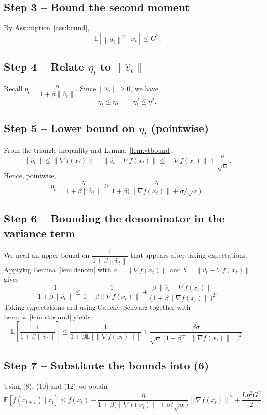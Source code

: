 \documentclass{article}
\newcommand{\EE}{\mathbb{E}}
\newcommand{\norm}[1]{\left\|#1\right\|}
\begin{document}
\subsection*{Step 3 – Bound the second moment}
By Assumption~\ref{ass:bound},
\[
\EE\!\left[\norm{g_t}^{2}\mid x_t\right]\le G^{2}.
\tag{7}
\]

\subsection*{Step 4 – Relate $\eta_t$ to $\norm{\hat v_t}$}
Recall $\eta_t=\dfrac{\eta}{1+\beta\norm{\hat v_t}}$.
Since $\norm{\hat v_t}\ge0$, we have
\[
\eta_t\le\eta,\qquad 
\eta_t^{2}\le\eta^{2}.
\tag{8}
\]

\subsection*{Step 5 – Lower bound on $\eta_t$ (pointwise)}
From the triangle inequality and Lemma~\ref{lem:vtbound},
\[
\norm{\hat v_t}\le \norm{\nabla f(x_t)}+\norm{\hat v_t-\nabla f(x_t)}
\le \norm{\nabla f(x_t)}+\frac{\sigma}{\sqrt{\alpha}} .
\tag{9}
\]
Hence, pointwise,
\[
\eta_t
=\frac{\eta}{1+\beta\norm{\hat v_t}}
\ge
\frac{\eta}{1+\beta\bigl(\norm{\nabla f(x_t)}+\sigma/\sqrt{\alpha}\bigr)} .
\tag{10}
\]

\subsection*{Step 6 – Bounding the denominator in the variance term}
We need an upper bound on $\dfrac{1}{1+\beta\norm{\hat v_t}}$ that appears after taking expectations.
Applying Lemma~\ref{lem:denom} with $a=\norm{\nabla f(x_t)}$ and
$b=\norm{\hat v_t-\nabla f(x_t)}$ gives
\[
\frac{1}{1+\beta\norm{\hat v_t}}
\le
\frac{1}{1+\beta\norm{\nabla f(x_t)}}
+\frac{\beta\,\norm{\hat v_t-\nabla f(x_t)}}{\bigl(1+\beta\norm{\nabla f(x_t)}\bigr)^{2}} .
\tag{11}
\]
Taking expectations and using Cauchy–Schwarz together with Lemma~\ref{lem:vtbound} yields
\[
\EE\!\left[\frac{1}{1+\beta\norm{\hat v_t}}\right]
\le
\frac{1}{1+\beta\EE\!\left[\norm{\nabla f(x_t)}\right]}
+\frac{\beta\sigma}{\sqrt{\alpha}\,\bigl(1+\beta\EE\!\left[\norm{\nabla f(x_t)}\right]\bigr)^{2}} .
\tag{12}
\]

\subsection*{Step 7 – Substitute the bounds into (6)}
Using (8), (10) and (12) we obtain
\[
\EE\!\left[f(x_{t+1})\mid x_t\right]
\le
f(x_t)
-\frac{\eta}{1+\beta\bigl(\norm{\nabla f(x_t)}+\sigma/\sqrt{\alpha}\bigr)}\norm{\nabla f(x_t)}^{2}
+\frac{L\eta^{2}G^{2}}{2}.
\tag{13}
\]
\end{document}

